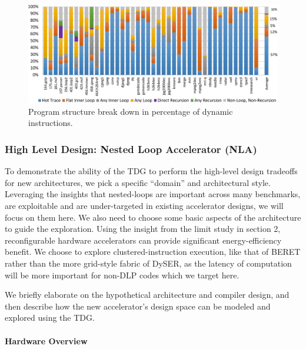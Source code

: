 \begin{figure}
  \begin{center}
    \includegraphics[width=1.0\linewidth]{figs/region-type.pdf}
  \end{center}
\vspace{-0.2in}
  \caption{Program structure break down in percentage of dynamic instructions.}
  \label{fig:region-type}
\vspace{-0.05in}
\end{figure}

\subsubsection{High Level Design: Nested Loop Accelerator (NLA)} \label{sec:hld}
To demonstrate the ability of the TDG to perform the high-level design tradeoffs
for new architectures, we pick a specific ``domain'' and architectural style.  
Leveraging the insights that nested-loops are important across many benchmarks, 
are exploitable and are under-targeted in existing accelerator designs, we will focus 
on them here.  We also need to choose some basic aspects of the architecture
to guide the exploration.  Using the insight from the limit study in section 2,
reconfigurable hardware accelerators can provide significant energy-efficiency
benefit.  We choose to explore clustered-instruction execution, like that of
BERET rather than the more grid-style fabric of DySER, as the latency of computation
will be more important for non-DLP codes which we target here.

We briefly elaborate on the hypothetical architecture and compiler design, 
and then describe how the new accelerator's design space can 
be modeled and explored using the TDG.

\paragraph{Hardware Overview}

